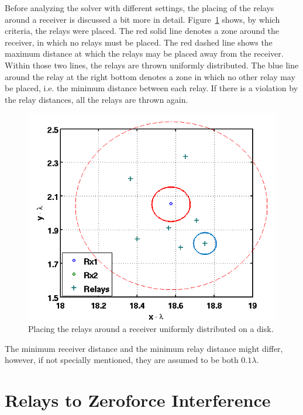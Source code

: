 Before analyzing the solver with different settings, the placing of the relays around a receiver is discussed a bit more in detail.
Figure~\ref{fig:cloud} shows, by which criteria, the relays were placed.
The red solid line denotes a zone around the receiver, in which no relays must be placed.
The red dashed line shows the maximum distance at which the relays may be placed away from the receiver. 
Within those two lines, the relays are thrown uniformly distributed.
The blue line around the relay at the right bottom denotes a zone in which no other relay may be placed, i.e. the minimum distance between each relay.
If there is a violation by the relay distances, all the relays are thrown again.
\begin{figure}[h]
\centering
  \includegraphics[width=0.9\linewidth]{images/cloud.png}
\caption{Placing the relays around a receiver uniformly distributed on a disk.}
\label{fig:cloud}
\end{figure}

The minimum receiver distance and the minimum relay distance might differ, however, if not specially mentioned, they are assumed to be both $0.1\lambda$.



\section{Relays to Zeroforce Interference}
\label{sec:interf_fix}

